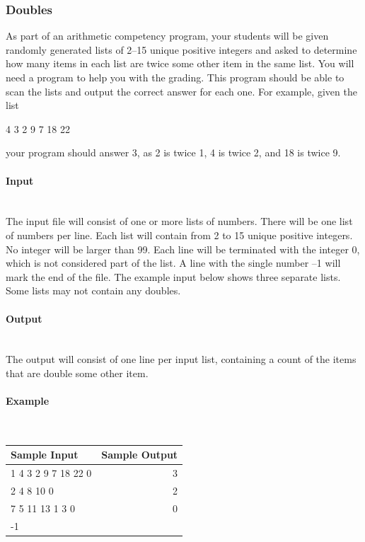 \documentclass{article}
\begin{document}

\subsubsection{Doubles}

As part of an arithmetic competency program, your students will be given randomly generated lists of 2–15 unique positive integers and asked to determine how many items in each list are twice some other item in the same list. You will need a program to help you with the grading. This program should be able to scan the lists and output the correct answer for each one. For example, given the list

{ 4 3 2 9 7 18 22 \par}

your program should answer 3, as 2 is twice 1, 4 is twice 2, and 18 is twice 9.

\paragraph{Input} \mbox{} \\

The input file will consist of one or more lists of numbers. There will be one list of numbers per
line. Each list will contain from 2 to 15 unique positive integers. No integer will be larger than 99.
Each line will be terminated with the integer 0, which is not considered part of the list. A line with
the single number –1 will mark the end of the file. The example input below shows three separate
lists. Some lists may not contain any doubles.

\paragraph{Output}\mbox{} \\

The output will consist of one line per input list, containing a count of the items that are double
some other item.

\paragraph{Example}\mbox{} \\

\begin{table}[h]
    \centering
    \begin{tabular}{|l|r|}
        \hline
        \textbf{Sample Input} & \textbf{Sample Output} \\
        \hline
        1 4 3 2 9 7 18 22 0  &  3 \\ 
        2 4 8 10 0    & 2 \\ 
        7 5 11 13 1 3 0  &  0 \\ 
        -1   &  \\ \hline
    \end{tabular}
\end{table}
\end{document}
